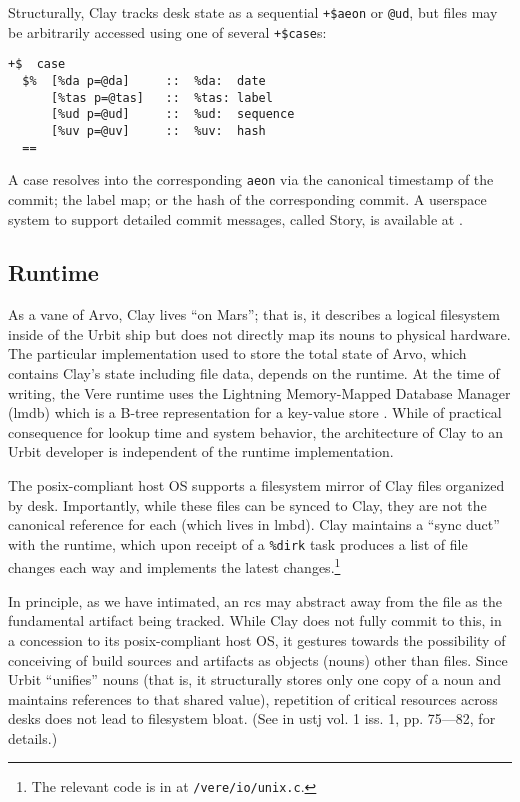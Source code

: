 \documentclass[twoside]{article}
\begin{document}
Structurally, Clay tracks desk state as a sequential \lstinline[style=inlinecode]{+$aeon} or \lstinline[style=inlinecode]{@ud}, but files may be arbitrarily accessed using one of several \lstinline[style=inlinecode]{+$case}s:

\begin{lstlisting}[style=listingcode]
+$  case
  $%  [%da p=@da]     ::  %da:  date
      [%tas p=@tas]   ::  %tas: label
      [%ud p=@ud]     ::  %ud:  sequence
      [%uv p=@uv]     ::  %uv:  hash
  ==
\end{lstlisting}

\noindent
A case resolves into the corresponding \lstinline[style=inlinecode]{aeon} via the canonical timestamp of the commit; the label map; or the hash of the corresponding commit.  A userspace system to support detailed commit messages, called Story, is available at .

\subsection{Runtime}

As a vane of Arvo, Clay lives ``on Mars''; that is, it describes a logical filesystem inside of the Urbit ship but does not directly map its nouns to physical hardware.  The particular implementation used to store the total state of Arvo, which contains Clay's state including file data, depends on the runtime.  At the time of writing, the Vere runtime uses the Lightning Memory-Mapped Database Manager ({\sc lmdb}) which is a B-tree representation for a key-value store \citep{LMDB}.  While of practical consequence for lookup time and system behavior, the architecture of Clay to an Urbit developer is independent of the runtime implementation.

The {\sc posix}-compliant host OS supports a filesystem mirror of Clay files organized by desk.  Importantly, while these files can be synced to Clay, they are not the canonical reference for each (which lives in {\sc lmbd}).  Clay maintains a ``sync duct'' with the runtime, which upon receipt of a \lstinline[style=inlinecode]{%dirk} task produces a list of file changes each way and implements the latest changes.\footnote{The relevant code is in  at \lstinline[style=inlinecode]{/vere/io/unix.c}.}

In principle, as we have intimated, an {\sc rcs} may abstract away from the file as the fundamental artifact being tracked.  While Clay does not fully commit to this, in a concession to its {\sc posix}-compliant host OS, it gestures towards the possibility of conceiving of build sources and artifacts as objects (nouns) other than files.  Since Urbit ``unifies'' nouns (that is, it structurally stores only one copy of a noun and maintains references to that shared value), repetition of critical resources across desks does not lead to filesystem bloat.  (See \citet{Blackman2024a} in {\sc ustj} vol. 1 iss. 1, pp. 75—82, for details.)
\end{document}

